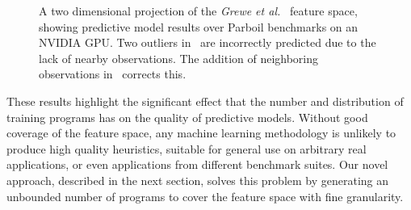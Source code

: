 \begin{figure}
  \caption{A two dimensional projection of the \emph{Grewe et al.\ } feature space, showing predictive model results over Parboil benchmarks on an NVIDIA GPU. Two outliers in~\protect{} are incorrectly predicted due to the lack of nearby observations. The addition of neighboring observations in~\protect{} corrects this.}%
  \label{fig:pca-benchmarks}
\end{figure}

These results highlight the significant effect that the number and distribution of training programs has on the quality of predictive models. Without good coverage of the feature space, any machine learning methodology is unlikely to produce high quality heuristics, suitable for general use on arbitrary real applications, or even applications from different benchmark suites. Our novel approach, described in the next section, solves this problem by generating an unbounded number of programs to cover the feature space with fine granularity.
